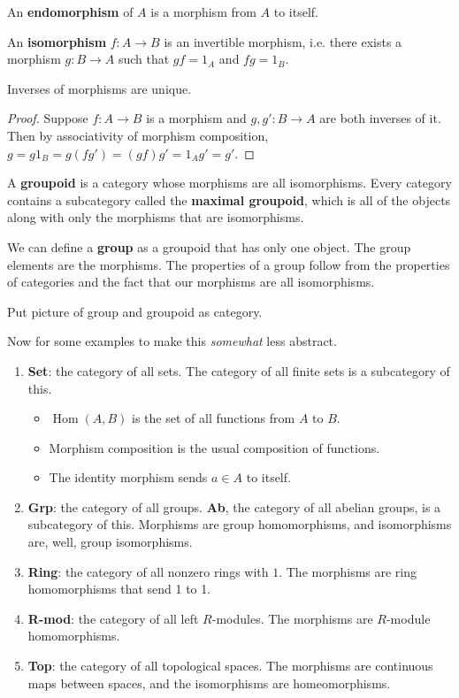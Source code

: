 \documentclass[10pt]{report}
\DeclareMathOperator{\hh}{Hom}
\begin{document}
\begin{defn}
An \textbf{endomorphism} of $A$ is a morphism from $A$ to itself.
\end{defn}

\begin{defn}
	An \textbf{isomorphism} $f:A\to B$ is an invertible morphism, i.e. there exists a morphism $g:B\to A$ such that $gf=1_{A}$ and $fg=1_{B}$.
\end{defn}

\begin{prop}
Inverses of morphisms are unique.
\end{prop}
\begin{proof}
Suppose $f:A \to B$ is a morphism and $g,g': B \to A$ are both inverses of it. Then by associativity of morphism composition, $g=g1_{B}=g(fg')=(gf)g'=1_{A}g'=g'.$
\end{proof}

\begin{defn}[]
A \textbf{groupoid} is a category whose morphisms are all isomorphisms. Every category contains a subcategory called the \textbf{maximal groupoid}, which is all of the objects along with only the morphisms that are isomorphisms.
\end{defn}

\begin{ex}[]
	We can define a \textbf{group} as a groupoid that has only one object. The group elements are the morphisms. The properties of a group follow from the properties of categories and the fact that our morphisms are all isomorphisms.
\end{ex}

{\color{red}Put picture of group and groupoid as category.}

Now for some examples to make this \textit{somewhat} less abstract.

\begin{enumerate}
	\item \textbf{Set}: the category of all sets. The category of all finite sets is a subcategory of this.
		\begin{itemize}
			\item $\hh(A,B)$ is the set of all functions from $A$ to $B$.
			\item Morphism composition is the usual composition of functions.
			\item The identity morphism sends $a \in A$ to itself.
		\end{itemize}
	\item \textbf{Grp}: the category of all groups. \textbf{Ab}, the category of all abelian groups, is a subcategory of this. Morphisms are group homomorphisms, and isomorphisms are, well, group isomorphisms.
	\item \textbf{Ring}: the category of all nonzero rings with $1$. The morphisms are ring homomorphisms that send 1 to 1.
	\item \textbf{R-mod}: the category of all left $R$-modules. The morphisms are $R$-module homomorphisms.
	\item \textbf{Top}: the category of all topological spaces. The morphisms are continuous maps between spaces, and the isomorphisms are homeomorphisms.
\end{enumerate}
\end{document}
